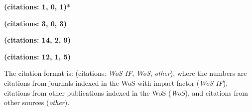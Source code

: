 
\newcommand{\citations}[3]{\textbf{(citations: #1, #2, #3)}} %




\begin{description}
    \item {}
    \item {} \citations{1}{0}{1}*
    \item {} \citations{3}{0}{3}
    \item {} 
    \item {} \citations{14}{2}{9}
    \item {} \citations{12}{1}{5}
\end{description} 
    





\begin{description}
    \item {} 
\end{description}

{\footnotesize *The citation format is: (citations: \emph{WoS IF}, \emph{WoS}, \emph{other}), where the numbers are citations from journals indexed in the WoS with impact factor (\emph{WoS IF}), citations from other publications indexed in the WoS (\emph{WoS}), and citations from other sources (\emph{other}).}

